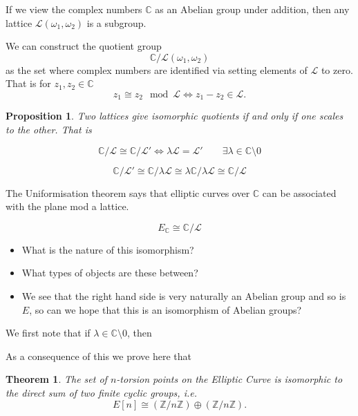 \documentclass{article}
\newtheorem{thm}{Theorem}[section]
\newtheorem{prop}{Proposition}[section]
\theoremstyle{definition}
\theoremstyle{definition}
\theoremstyle{definition}
\newcommand{\C}{\mathbb{C}}
\newcommand{\Z}{\mathbb{Z}}
\begin{document}
If we view the complex numbers $\C$ as an Abelian group under addition, then any lattice $\mathcal{L}(\omega_1,\omega_2)$ is a subgroup.

We can construct the quotient group 
$$\C/\mathcal{L}(\omega_1,\omega_2)$$
as the set where complex numbers are identified via setting elements of $\mathcal{L}$ to zero. That is for $z_1,z_2\in\C$
$$z_1\cong z_2\mod \mathcal{L}\iff z_1-z_2\in\mathcal{L}.$$

\begin{prop}
    Two lattices give isomorphic quotients if and only if one scales to the other. That is 

$$\C/\mathcal{L}\cong\C/\mathcal{L}'\iff \lambda\mathcal{L}=\mathcal{L}' \qquad\exists\lambda\in\C\setminus0$$
\end{prop}
$$\C/\mathcal{L}'\cong\C/\lambda\mathcal{L}\cong \lambda\C/\lambda\mathcal{L}\cong \C/\mathcal{L}$$


The Uniformisation theorem says that elliptic curves over $\C$ can be associated with the plane mod a lattice.

$$E_\C\cong \C/\mathcal{L}$$

\begin{itemize}
    \item What is the nature of this isomorphism? 
    \item What types of objects are these between?
    \item We see that the right hand side is very naturally an Abelian group and so is $E$, so can we hope that this is an isomorphism of Abelian groups?
\end{itemize}

We first note that if $\lambda\in\C\setminus 0$, then 




As a consequence of this we prove here that




 

\begin{thm}\label{EC Iso}
    The set of $n$-torsion points on the Elliptic Curve is isomorphic to the direct sum of two finite cyclic groups, i.e. 
    $$E[n] \cong (\mathbb{Z}/n\mathbb{Z}) \oplus (\mathbb{Z}/n\mathbb{Z}).$$ 
\end{thm}
\end{document}
